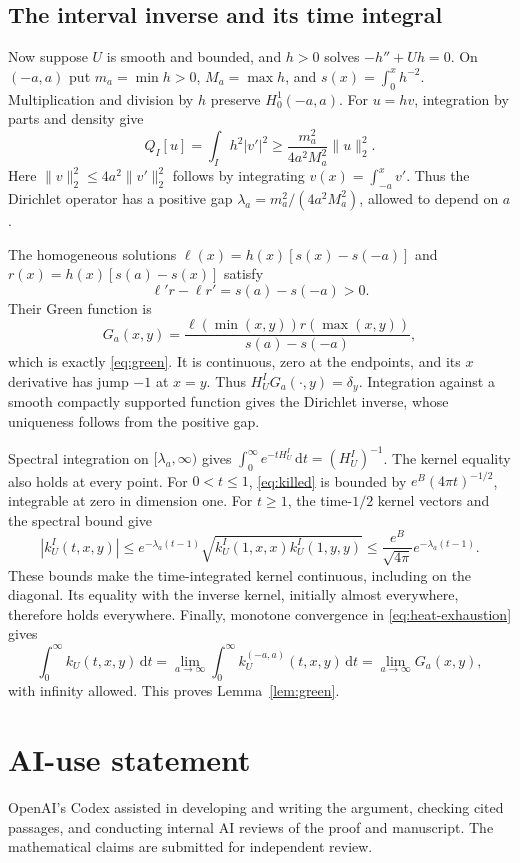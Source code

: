 \documentclass[11pt,a4paper]{article}
\newcommand{\dd}{\,\mathrm d}
\begin{document}
\subsection*{The interval inverse and its time integral}
Now suppose $U$ is smooth and bounded, and $h>0$ solves $-h''+Uh=0$.
On $(-a,a)$ put $m_a=\min h>0$, $M_a=\max h$, and
$s(x)=\int_0^xh^{-2}$. Multiplication and division by $h$ preserve
$H^1_0(-a,a)$. For $u=hv$, integration by parts and density give
\[
 Q_I[u]=\int_Ih^2|v'|^2
 \geq\frac{m_a^2}{4a^2M_a^2}\|u\|_2^2.
\]
Here $\|v\|_2^2\leq4a^2\|v'\|_2^2$ follows by integrating
$v(x)=\int_{-a}^xv'$. Thus the Dirichlet operator has a positive gap
$\lambda_a=m_a^2/(4a^2M_a^2)$, allowed to depend on $a$.

The homogeneous solutions
$\ell(x)=h(x)[s(x)-s(-a)]$ and $r(x)=h(x)[s(a)-s(x)]$ satisfy
\[
 \ell'r-\ell r'=s(a)-s(-a)>0.
\]
Their Green function is
\[
 G_a(x,y)=\frac{\ell(\min(x,y))r(\max(x,y))}{s(a)-s(-a)},
\]
which is exactly \eqref{eq:green}. It is continuous, zero at the
endpoints, and its $x$ derivative has jump $-1$ at $x=y$. Thus
$H_U^I G_a(\cdot,y)=\delta_y$. Integration against a smooth compactly
supported function gives the Dirichlet inverse, whose uniqueness follows
from the positive gap.

Spectral integration on $[\lambda_a,\infty)$ gives
$\int_0^\infty e^{-tH_U^I}\dd t=(H_U^I)^{-1}$. The kernel equality also
holds at every point. For $0<t\leq1$, \eqref{eq:killed} is bounded by
$e^B(4\pi t)^{-1/2}$, integrable at zero in dimension one. For $t\geq1$,
the time-$1/2$ kernel vectors and the spectral bound give
\[
 |k_U^I(t,x,y)|
 \leq e^{-\lambda_a(t-1)}
       \sqrt{k_U^I(1,x,x)k_U^I(1,y,y)}
 \leq\frac{e^B}{\sqrt{4\pi}}e^{-\lambda_a(t-1)}.
\]
These bounds make the time-integrated kernel continuous, including on the
diagonal. Its equality with the inverse kernel, initially almost everywhere,
therefore holds everywhere. Finally, monotone convergence in
\eqref{eq:heat-exhaustion} gives
\[
 \int_0^\infty k_U(t,x,y)\dd t
  =\lim_{a\to\infty}\int_0^\infty k_U^{(-a,a)}(t,x,y)\dd t
  =\lim_{a\to\infty}G_a(x,y),
\]
with infinity allowed. This proves Lemma~\ref{lem:green}.

\section*{AI-use statement}
OpenAI's Codex assisted in developing and writing the argument, checking
cited passages, and conducting internal AI reviews of the proof and
manuscript. The mathematical claims are submitted for independent review.
\end{document}
